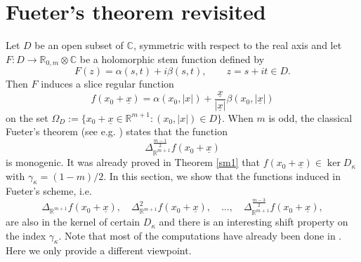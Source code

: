 \documentclass{amsart}
\theoremstyle{definition}
\theoremstyle{remark}
\numberwithin{equation}{section}
\begin{document}
\section{Fueter's theorem revisited}\label{fuet1}
   Let $D$ be an open subset of $\mathbb{C}$, symmetric with respect to the real axis and let $F:D\to\mathbb{R}_{0,m}\otimes\mathbb{C}$ be a holomorphic stem function defined by
    \begin{equation*}
        F(z)=\alpha(s, t)+i\beta(s, t), \qquad z=s+it\in D.
    \end{equation*}
    Then  $F$
    induces a slice regular function
    \begin{equation} \label{isr2}
        f(x_{0}+\underline{x})=\alpha(x_{0}, |x|)+\frac{\underline{x}}{|\underline{x}|}\beta(x_{0}, |\underline{x}|)
    \end{equation}
    on the set  $ \Omega_{D}:=\{x_{0}+\underline{x}\in \mathbb{R}^{m+1}: (x_{0}, |x|)\in D\}$. When $m$ is odd,
    the classical Fueter's theorem (see e.g. \cite{fue, qian, sce}) states that  the function
    \begin{equation*}
        \Delta_{\mathbb{R}^{m+1}}^{\frac{m-1}{2}}   f(x_{0}+\underline{x})
    \end{equation*}
    is monogenic. It was already proved in Theorem \ref{sm1} that $f(x_{0}+\underline{x}) \in \ker D_\kappa$ with $\gamma_{\kappa}=(1-m)/2$.
    In this section, we show that the functions induced in Fueter's scheme, i.e.
    \begin{equation*}
        \Delta_{\mathbb{R}^{m+1}}  f(x_{0}+\underline{x}), \quad \Delta_{\mathbb{R}^{m+1}} ^{2}f(x_{0}+\underline{x}), \quad \ldots, \quad \Delta_{\mathbb{R}^{m+1}} ^{\frac{m-3}{2}}   f(x_{0}+\underline{x}),
    \end{equation*} are also in the kernel of certain $D_{\kappa}$ and there is an interesting shift property on the index $\gamma_{\kappa}$.  Note that most of the computations have already been done in \cite{fck}. Here we only provide a different viewpoint.
\end{document}
